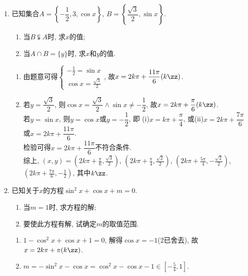 \begin{enumerate}
\item 已知集合$A=\left\{-\dfrac{1}{2},3,\cos{x}\right\}$, $B=\left\{\dfrac{\sqrt{3}}{2},\sin{x}\right\}$. 
\begin{enumerate}[(1)]
\item 当$B\subsetneqq A$时, 求$x$的值;
\item 当$A\cap B=\{y\}$时, 求$x$和$y$的值. 
\end{enumerate}
\begin{jieda}
\begin{enumerate}[(1)]
\item 由题意可得$\begin{cases}
-\frac{1}{2}=\sin{x}\\
\cos{x}=\frac{\sqrt{3}}{2}
\end{cases}$, 故$x=2k\pi+\dfrac{11\pi}{6}(k\zz)$. 

\item 若$y=\dfrac{\sqrt{3}}{2}$, 则$\cos{x}=\dfrac{\sqrt{3}}{2}\land\sin{x}\neq-\dfrac{1}{2}$, 故$x=2k\pi+\dfrac{\pi}{6}(k\zz)$. \\
若$y=\sin{x}$, 则$y=\cos{x}$或$y=-\dfrac{1}{2}$, 即 (i)$x=k\pi+\dfrac{\pi}{4}$, 或(ii)$x=2k\pi+\dfrac{7\pi}{6}$或$x=2k\pi+\dfrac{11\pi}{6}$. \\
检验可得$x=2k\pi+\dfrac{11\pi}{6}$不符合条件. \\
综上, $(x,y)=(2k\pi+\frac{\pi}{6},\frac{\sqrt{3}}{2})$, $(2k\pi+\frac{\pi}{4},\frac{\sqrt{2}}{2})$, 
$(2k\pi+\frac{5\pi}{4},-\frac{\sqrt{2}}{2})$, $(2k\pi+\frac{7\pi}{6},-\frac{1}{2})$, 其中$k\zz$. 
\end{enumerate}
\end{jieda}


\item 已知关于$x$的方程$\sin^2x+\cos{x}+m=0$. 
\begin{enumerate}
\item 当$m=1$时, 求方程的解; 
\item 要使此方程有解, 试确定$m$的取值范围. 
\end{enumerate}
\begin{jieda}
\begin{enumerate}[(1)]
\item $1-\cos^2x+\cos{x}+1=0$, 解得$\cos{x}=-1$(2已舍去), 故$x=2k\pi+\pi(k\zz)$. 

\item $m=-\sin^2x-\cos{x}=\cos^2x-\cos{x}-1\in[-\frac{5}{4},1]$. 
\end{enumerate}
\end{jieda}
\end{enumerate}





